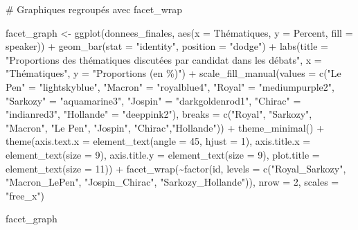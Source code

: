 \documentclass[
  letterpaper,
  DIV=11,
  numbers=noendperiod]{scrartcl}
\newenvironment{Shaded}{\begin{snugshade}}{\end{snugshade}}
\newcommand{\AttributeTok}[1]{\textcolor[rgb]{0.40,0.45,0.13}{#1}}
\newcommand{\CommentTok}[1]{\textcolor[rgb]{0.37,0.37,0.37}{#1}}
\newcommand{\DecValTok}[1]{\textcolor[rgb]{0.68,0.00,0.00}{#1}}
\newcommand{\FunctionTok}[1]{\textcolor[rgb]{0.28,0.35,0.67}{#1}}
\newcommand{\NormalTok}[1]{\textcolor[rgb]{0.00,0.23,0.31}{#1}}
\newcommand{\OtherTok}[1]{\textcolor[rgb]{0.00,0.23,0.31}{#1}}
\newcommand{\SpecialCharTok}[1]{\textcolor[rgb]{0.37,0.37,0.37}{#1}}
\newcommand{\StringTok}[1]{\textcolor[rgb]{0.13,0.47,0.30}{#1}}
\begin{document}
\begin{Shaded}
\begin{Highlighting}[]
\CommentTok{\# Graphiques regroupés avec facet\_wrap}

\NormalTok{facet\_graph }\OtherTok{\textless{}{-}} \FunctionTok{ggplot}\NormalTok{(donnees\_finales, }\FunctionTok{aes}\NormalTok{(}\AttributeTok{x =}\NormalTok{ Thématiques, }\AttributeTok{y =}\NormalTok{ Percent, }\AttributeTok{fill =}\NormalTok{ speaker)) }\SpecialCharTok{+} \FunctionTok{geom\_bar}\NormalTok{(}\AttributeTok{stat =} \StringTok{"identity"}\NormalTok{, }\AttributeTok{position =} \StringTok{"dodge"}\NormalTok{) }\SpecialCharTok{+} \FunctionTok{labs}\NormalTok{(}\AttributeTok{title =} \StringTok{"Proportions des thématiques discutées par candidat dans les débats"}\NormalTok{, }\AttributeTok{x =} \StringTok{"Thématiques"}\NormalTok{, }\AttributeTok{y =} \StringTok{"Proportions (en \%)"}\NormalTok{) }\SpecialCharTok{+} \FunctionTok{scale\_fill\_manual}\NormalTok{(}\AttributeTok{values =} \FunctionTok{c}\NormalTok{(}\StringTok{"Le Pen"} \OtherTok{=} \StringTok{"lightskyblue"}\NormalTok{, }\StringTok{"Macron"} \OtherTok{=} \StringTok{"royalblue4"}\NormalTok{, }\StringTok{"Royal"} \OtherTok{=} \StringTok{"mediumpurple2"}\NormalTok{, }\StringTok{"Sarkozy"} \OtherTok{=} \StringTok{"aquamarine3"}\NormalTok{, }\StringTok{"Jospin"} \OtherTok{=} \StringTok{"darkgoldenrod1"}\NormalTok{, }\StringTok{"Chirac"} \OtherTok{=} \StringTok{"indianred3"}\NormalTok{, }\StringTok{"Hollande"} \OtherTok{=} \StringTok{"deeppink2"}\NormalTok{), }\AttributeTok{breaks =} \FunctionTok{c}\NormalTok{(}\StringTok{"Royal"}\NormalTok{, }\StringTok{"Sarkozy"}\NormalTok{, }\StringTok{"Macron"}\NormalTok{, }\StringTok{"Le Pen"}\NormalTok{, }\StringTok{"Jospin"}\NormalTok{, }\StringTok{"Chirac"}\NormalTok{,}\StringTok{"Hollande"}\NormalTok{)) }\SpecialCharTok{+} \FunctionTok{theme\_minimal}\NormalTok{() }\SpecialCharTok{+} \FunctionTok{theme}\NormalTok{(}\AttributeTok{axis.text.x =} \FunctionTok{element\_text}\NormalTok{(}\AttributeTok{angle =} \DecValTok{45}\NormalTok{, }\AttributeTok{hjust =} \DecValTok{1}\NormalTok{), }\AttributeTok{axis.title.x =} \FunctionTok{element\_text}\NormalTok{(}\AttributeTok{size =} \DecValTok{9}\NormalTok{), }\AttributeTok{axis.title.y =} \FunctionTok{element\_text}\NormalTok{(}\AttributeTok{size =} \DecValTok{9}\NormalTok{), }\AttributeTok{plot.title =} \FunctionTok{element\_text}\NormalTok{(}\AttributeTok{size =} \DecValTok{11}\NormalTok{)) }\SpecialCharTok{+} \FunctionTok{facet\_wrap}\NormalTok{(}\SpecialCharTok{\textasciitilde{}}\FunctionTok{factor}\NormalTok{(id, }\AttributeTok{levels =} \FunctionTok{c}\NormalTok{(}\StringTok{"Royal\_Sarkozy"}\NormalTok{, }\StringTok{"Macron\_LePen"}\NormalTok{, }\StringTok{"Jospin\_Chirac"}\NormalTok{, }\StringTok{"Sarkozy\_Hollande"}\NormalTok{)), }\AttributeTok{nrow =} \DecValTok{2}\NormalTok{, }\AttributeTok{scales =} \StringTok{"free\_x"}\NormalTok{)}

\NormalTok{facet\_graph}
\end{Highlighting}
\end{Shaded}
\end{document}
